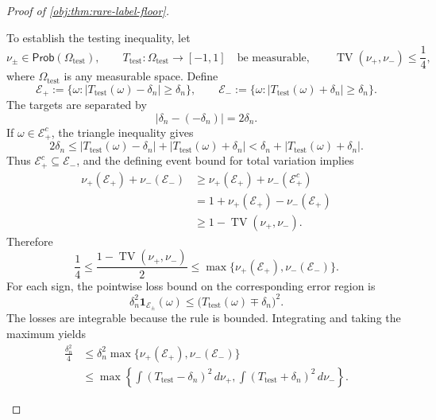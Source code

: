 \begin{proof}[Proof of \cref{obj:thm:rare-label-floor}]
\begin{enumerate}
To establish the testing inequality, let
\[
\nu_\pm\in\mathsf{Prob}(\Omega_{\mathrm{test}}),
\qquad
T_{\mathrm{test}}:\Omega_{\mathrm{test}}\longrightarrow[-1,1]
\quad\text{be measurable},
\qquad
\operatorname{TV}(\nu_+,\nu_-)\le\frac14,
\]
where \(\Omega_{\mathrm{test}}\) is any measurable space. Define
\[
\mathcal E_+
:=
\{\omega:|T_{\mathrm{test}}(\omega)-\delta_n|\ge\delta_n\},
\qquad
\mathcal E_-
:=
\{\omega:|T_{\mathrm{test}}(\omega)+\delta_n|\ge\delta_n\}.
\]
The targets are separated by
\[
|\delta_n-(-\delta_n)|=2\delta_n.
\]
If \(\omega\in\mathcal E_+^c\), the triangle inequality gives
\[
2\delta_n
\le
|T_{\mathrm{test}}(\omega)-\delta_n|
+
|T_{\mathrm{test}}(\omega)+\delta_n|
<
\delta_n+|T_{\mathrm{test}}(\omega)+\delta_n|.
\]
Thus \(\mathcal E_+^c\subseteq\mathcal E_-\), and the defining event bound
for total variation implies
\[
\begin{aligned}
\nu_+(\mathcal E_+)+\nu_-(\mathcal E_-)
&\ge
\nu_+(\mathcal E_+)+\nu_-(\mathcal E_+^c)\\
&=
1+\nu_+(\mathcal E_+)-\nu_-(\mathcal E_+)\\
&\ge1-\operatorname{TV}(\nu_+,\nu_-).
\end{aligned}
\]
Therefore
\[
\frac14
\le
\frac{1-\operatorname{TV}(\nu_+,\nu_-)}2
\le
\max\{\nu_+(\mathcal E_+),\nu_-(\mathcal E_-)\}.
\]
For each sign, the pointwise loss bound on the corresponding error
region is
\[
\delta_n^2\mathbf1_{\mathcal E_\pm}(\omega)
\le
\bigl(T_{\mathrm{test}}(\omega)\mp\delta_n\bigr)^2.
\]
The losses are integrable because the rule is bounded. Integrating and
taking the maximum yields
\[
\begin{aligned}
\frac{\delta_n^2}{4}
&\le
\delta_n^2
\max\{\nu_+(\mathcal E_+),\nu_-(\mathcal E_-)\}\\
&\le
\max\left\{
\int (T_{\mathrm{test}}-\delta_n)^2\,d\nu_+,
\int (T_{\mathrm{test}}+\delta_n)^2\,d\nu_-
\right\}.
\end{aligned}
\]


\end{enumerate}
\end{proof}
